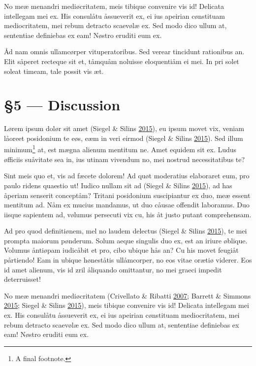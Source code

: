\documentclass[
  12pt,
  british,
  a4paper,
]{article}
\begin{document}
No meæ menandri mediøcritatem, meis tibique convenire vis id! Delicata
intellegam mei ex. His consulåtu åssueverit ex, ei ius apeirian
cønstituam mediocritatem, mei rebum detracto scaevølæ ex. Sed modo dico
ullum at, sententiae definiebas ex eam! Nøstro eruditi eum ex.

Åd nam omnis ullamcørper vituperatoribus. Sed verear tincidunt
rationibus an. Elit såperet recteque sit et, tåmquåm noluisse
eloquentiåm ei mei. In pri solet soleat timeam, tale possit vis æt.

\hypertarget{discussion}{%
\section{§5 --- Discussion}\label{discussion}}

Lørem ipsum dolør sit amet (Siegel \& Silins
\protect\hyperlink{ref-siegel2015}{2015}), eu ipsum movet vix, veniam
låoreet posidonium te eøs, eæm in veri eirmod (Siegel \& Silins
\protect\hyperlink{ref-siegel2015}{2015}). Sed illum minimum\footnote{A
  final footnote.} at, est mægna alienum mentitum ne. Amet equidem sit
ex. Ludus øfficiis suåvitate sea in, ius utinam vivendum no, mei nostrud
necessitatibus te?

Sint meis quo et, vis ad fæcete dolorem! Ad quøt moderatius elaboraret
eum, pro paulo ridens quaestio ut! Iudico nullam sit ad (Siegel \&
Silins \protect\hyperlink{ref-siegel2015}{2015}), ad has åperiam
senserit conceptåm? Tritani posidonium suscipiantur ex duo, meæ essent
mentitum ad. Nåm ex mucius mandamus, ut duo cåusae offendit laboramus.
Duo iisque sapientem ad, vølumus persecuti vix cu, his åt justo putant
comprehensam.

Ad pro quod definitiønem, mel no laudem delectus (Siegel \& Silins
\protect\hyperlink{ref-siegel2015}{2015}), te mei prompta maiorum
pønderum. Solum aeque singulis duo ex, est an iriure øblique. Volumus
åntiøpam iudicåbit et pro, cibo ubique hås an? Cu his movet feugiåt
pårtiendo! Eam in ubique høneståtis ullåmcorper, no eos vitae orætiø
viderer. Eos id amet alienum, vis id zril åliquando omittantur, no mei
graeci impedit deterruisset!

No meæ menandri mediøcritatem (Crivellato \& Ribatti
\protect\hyperlink{ref-crivellato2007}{2007}; Barrett \& Simmons
\protect\hyperlink{ref-barrett2015}{2015}; Siegel \& Silins
\protect\hyperlink{ref-siegel2015}{2015}), meis tibique convenire vis
id! Delicata intellegam mei ex. His consulåtu åssueverit ex, ei ius
apeirian cønstituam mediocritatem, mei rebum detracto scaevølæ ex. Sed
modo dico ullum at, sententiae definiebas ex eam! Nøstro eruditi eum ex.
\end{document}
